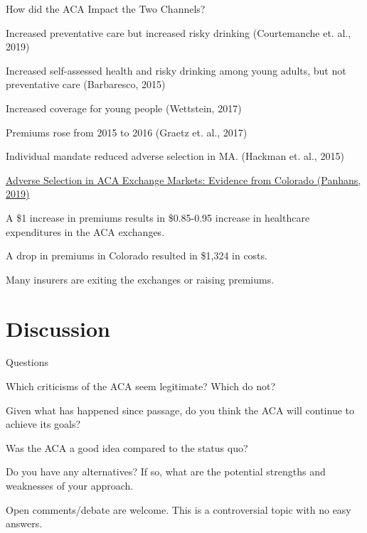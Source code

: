 \documentclass[aspectratio=169]{beamer}
\newenvironment{wideitemize}{\itemize\addtolength{\itemsep}{10pt}}{\enditemize}
\begin{document}
\begin{frame}{How did the ACA Impact the Two Channels?}

\begin{wideitemize}
    \item Increased preventative care but increased risky drinking (Courtemanche et. al., 2019)
    \item Increased self-assessed health and risky drinking among young adults, but not preventative care (Barbaresco, 2015)
    \item Increased coverage for young people (Wettstein, 2017)
    \item Premiums rose from 2015 to 2016 (Graetz et. al., 2017)
    \item Individual mandate reduced adverse selection in MA. (Hackman et. al., 2015)
    \item \hyperlink{https://www.aeaweb.org/articles?id=10.1257/app.20170117}{Adverse Selection in ACA Exchange Markets: Evidence from Colorado (Panhans, 2019)}
\begin{wideitemize}
        \item A \$1 increase in premiums results in \$0.85-0.95 increase in healthcare expenditures in the ACA exchanges.
    \item A drop in premiums in Colorado resulted in \$1,324 in costs. 
    \item Many insurers are exiting the exchanges or raising premiums.
\end{wideitemize}
\end{wideitemize}

\end{frame}
\section{Discussion}

\begin{frame}{Questions}

\begin{wideitemize}
    \item Which criticisms of the ACA seem legitimate? Which do not?
    \item Given what has happened since passage, do you think the ACA will continue to achieve its goals?
    \item Was the ACA a good idea compared to the status quo?
    \item Do you have any alternatives? If so, what are the potential strengths and weaknesses of your approach.
    
    \item Open comments/debate are welcome. This is a controversial topic with no easy answers.
\end{wideitemize}
    
\end{frame}
\end{document}
